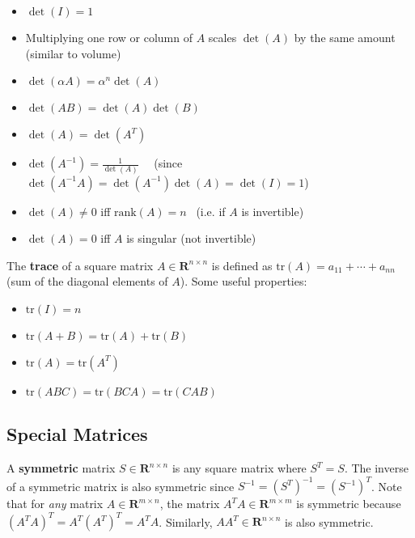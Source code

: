\documentclass[11pt]{article}
\theoremstyle{plain}
\theoremstyle{definition}
\theoremstyle{remark}
\numberwithin{equation}{section}
\begin{document}
\begin{itemize}[noitemsep]
\item $\det(I) = 1$
\item Multiplying one row or column of $A$ scales $\det(A)$ by the same amount (similar to volume)
\item $\det(\alpha A) = \alpha^n \det(A)$
\item $\det(AB) = \det(A) \det(B)$
\item $\det(A) = \det(A^T)$
\item $\det(A^{-1}) = \frac{1}{\det(A)}$ \ \ (since $\det(A^{-1} A) = \det(A^{-1}) \det(A) = \det(I) = 1$)
\item $\det(A) \neq 0$ iff $\text{rank}(A) = n$ \ (i.e. if $A$ is invertible)
\item $\det(A) = 0$ iff $A$ is singular (not invertible)
\end{itemize}


The {\bf trace} of a square matrix $A \in \mathbf{R}^{n \times n}$ is defined as $\text{tr}(A) = a_{11} + \cdots + a_{nn}$ (sum of the diagonal elements of $A$). Some useful properties:
\begin{itemize}[noitemsep]
\item $\text{tr}(I) = n$
\item $\text{tr}(A + B) = \text{tr}(A) + \text{tr}(B)$
\item $\text{tr}(A) = \text{tr}(A^T)$
\item $\text{tr}(ABC) = \text{tr}(BCA) = \text{tr}(CAB)$
\end{itemize}



\subsection{Special Matrices}

A {\bf symmetric } matrix $S \in \mathbf{R}^{n \times n}$ is any square matrix where $S^T = S$. The inverse of a symmetric matrix is also symmetric since $S^{-1} = (S^T)^{-1} = (S^{-1})^T$. Note that for \textit{any} matrix $A \in \mathbf{R}^{m \times n}$, the matrix $A^T A \in \mathbf{R}^{m \times m}$ is symmetric because $(A^T A)^T = A^T (A^T)^T = A^T A$. Similarly, $A A^T \in \mathbf{R}^{n \times n}$ is also symmetric.
\\

\end{document}
